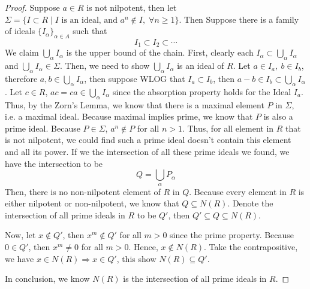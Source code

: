 \begin{answer}
    \begin{proof}
        Suppose $a \in R$ is not nilpotent, then let $\Sigma = \{I \subset R \mid I \text{ is an ideal, and } a^n \notin I,\; \forall n \geq 1\}$. Then Suppose there is a family of ideals $\{I_{\alpha}\}_{\alpha \in A}$ such that
        $$I_1 \subset I_2 \subset \cdots $$
        We claim $\bigcup_\alpha I_\alpha$ is the upper bound of the chain. First, clearly each $I_\alpha \subset \bigcup_{\alpha} I_\alpha$ and $\bigcup_\alpha I_\alpha \in \Sigma$. Then, we need to show $\bigcup_\alpha I_\alpha$ is an ideal of $R$. Let $a \in I_a,\ b \in I_b$, therefore $a,b \in \bigcup_\alpha I_\alpha$, then suppose WLOG that $I_a \subset I_b$, then $a - b \in I_b \subset \bigcup_\alpha I_\alpha$. Let $c \in R$, $ac = ca \in \bigcup_\alpha I_\alpha$ since the absorption property holds for the Ideal $I_a$. Thus, by the Zorn's Lemma, we know that there is a maximal element $P$ in $\Sigma$, i.e. a maximal ideal. Because maximal implies prime, we know that $P$ is also a prime ideal. Because $P \in \Sigma$, $a^n \notin P$ for all $n > 1$. Thus, for all element in $R$ that is not nilpotent, we could find such a prime ideal doesn't contain this element and all its power. If we the intersection of all these prime ideals we found, we have the intersection to be
        $$Q = \bigcup_\alpha P_{\alpha}$$
        Then, there is no non-nilpotent element of $R$ in $Q$. Because every element in $R$ is either nilpotent or non-nilpotent, we know that $Q \subseteq N(R)$. Denote the intersection of all prime ideals in $R$ to be $Q'$, then $Q' \subseteq Q \subseteq N(R)$.
        
        Now, let $x \notin Q'$, then $x^m \notin Q'$ for all $m >0$ since the prime property. Because $0 \in Q'$, then $x^m \neq 0$ for all $m > 0$. Hence, $x \notin N(R)$. Take the contrapositive, we have $x \in N(R) \Rightarrow x \in Q'$, this show $N(R) \subseteq Q'$.
        
        In conclusion, we know $N(R)$ is the intersection of all prime ideals in $R$.
    \end{proof}
\end{answer}